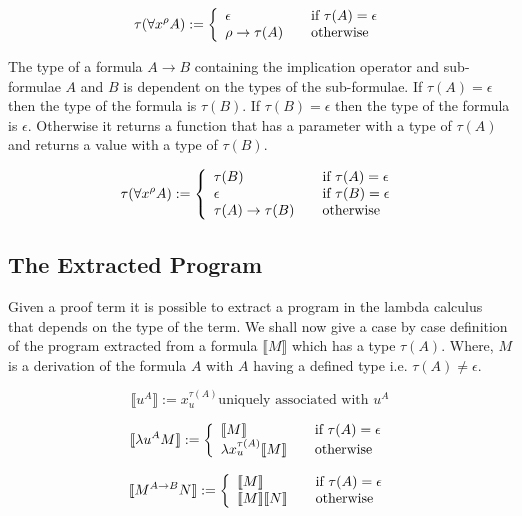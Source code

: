 \[
\tau(\forall x^{\rho} A) := \left\{ 
\begin{array}{l l}
  \epsilon & \quad \text{if $\tau(A) = \epsilon$}\\
 \rho \to \tau (A) & \quad \text{otherwise}\\
\end{array} \right.
\]


The type of a formula $A \to B$ containing the implication operator and
sub-formulae $A$ and $B$ is dependent on the types of the sub-formulae.
If $\tau (A) = \epsilon$ then the type of the formula is $ \tau (B)$. If $\tau
(B) = \epsilon$ then the type of the formula is $\epsilon$. Otherwise it
returns a function that has a parameter with a type of $\tau (A)$ and returns a value with
a type of $\tau (B)$.

\[
\tau(\forall x^{\rho} A) := \left\{ 
\begin{array}{l l}
  \tau (B) & \quad \text{if $\tau (A) = \epsilon$}\\
  \epsilon & \quad \text{if $\tau (B) = \epsilon$}\\
  \tau (A) \to \tau (B) & \quad \text{otherwise}\\
\end{array} \right.
\]

\subsection*{The Extracted Program}
Given a proof term it is possible to extract a program in the lambda calculus  that depends on the type of the term. We shall now give a case by case definition of the program extracted from a formula $\llbracket M \rrbracket$ which has a type $\tau (A)$. Where, $M$ is a derivation of the formula $A$ with $A$ having a defined type i.e. $ \tau (A) \neq \epsilon $.

\[ \llbracket u^A \rrbracket := x^{\tau (A)}_{u} \text{uniquely associated with $u^A$}
\]

\[
\llbracket \lambda u^A M \rrbracket := \left\{ 
\begin{array}{l l}
\llbracket M \rrbracket  & \quad \text{if $\tau (A) = \epsilon$} \\ 
\lambda x^{\tau (A)}_{u} \llbracket M \rrbracket & \quad \text{otherwise} \\

\end{array} \right.
 \]

\[
\llbracket M^{A \to B} N \rrbracket := \left\{ 
\begin{array}{l l}
\llbracket M \rrbracket  & \quad \text{if $\tau (A) = \epsilon$} \\ 
\llbracket M \rrbracket  \llbracket N \rrbracket & \quad \text{otherwise} \\

\end{array} \right.
 \]

